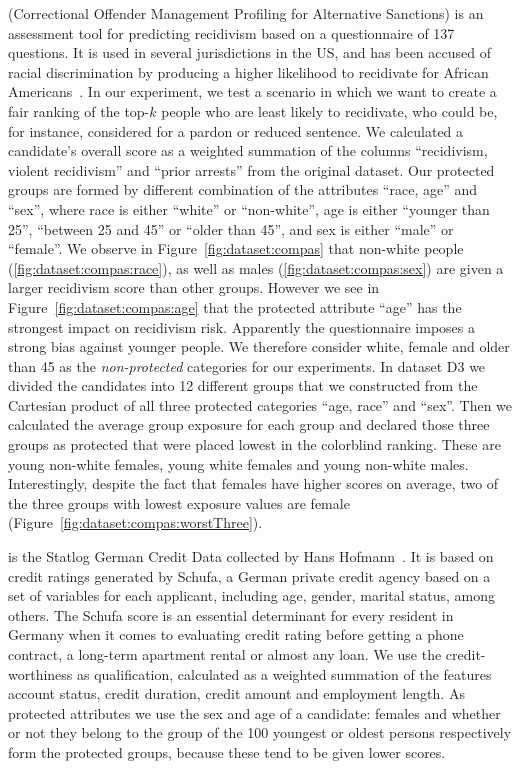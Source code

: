  (Correctional Offender Management Profiling for Alternative Sanctions) is an assessment tool for predicting recidivism based on a questionnaire of 137 questions. It is used in several jurisdictions in the US, and has been accused of racial discrimination by producing a higher likelihood to recidivate for African Americans~\cite{angwin_2016_machine}.
%
In our experiment, we test a scenario in which we want to create a fair ranking of the top-$k$ people who are least likely to recidivate, who could be, for instance, considered for a pardon or reduced sentence.
%
We calculated a candidate's overall score as a weighted summation of the columns ``recidivism, violent recidivism'' and ``prior arrests'' from the original dataset.
%
Our protected groups are formed by different combination of the attributes ``race, age'' and ``sex'', where race is either ``white'' or ``non-white'', age is either ``younger than 25'', ``between 25 and 45'' or ``older than 45'', and sex is either ``male'' or ``female''.
%
We observe in Figure~\ref{fig:dataset:compas} that non-white people (\ref{fig:dataset:compas:race}), as well as males (\ref{fig:dataset:compas:sex}) are given a larger recidivism score than other groups.
%
However we see in Figure~\ref{fig:dataset:compas:age} that the protected attribute ``age'' has the strongest impact on recidivism risk. 
%
Apparently the questionnaire imposes a strong bias against younger people.
%
We therefore consider white, female and older than 45 as the \emph{non-protected} categories for our experiments.
%
In dataset D3 we divided the candidates into 12 different groups that we constructed from the Cartesian product of all three protected categories ``age, race'' and ``sex''. 
%
Then we calculated the average group exposure for each group and declared those three groups as protected that were placed lowest in the colorblind ranking.
%
These are young non-white females, young white females and young non-white males.
%
Interestingly, despite the fact that females have higher scores on average, two of the three groups with lowest exposure values are female (Figure~\ref{fig:dataset:compas:worstThree}).

 is the Statlog German Credit Data collected by Hans Hofmann~\cite{lichman_2013_uci}.
%
It is based on credit ratings generated by Schufa, a German private credit agency based on a set of variables for each applicant, including age, gender, marital status, among others. The Schufa score is an essential determinant for every resident in Germany when it comes to evaluating credit rating before getting a phone contract, a long-term apartment rental or almost any loan.
%
We use the credit-worthiness as qualification, calculated as a weighted summation of the features account status, credit duration, credit amount and employment length. 
As protected attributes we use the sex and age of a candidate: females and whether or not they belong to the group of the 100 youngest or oldest persons respectively form the protected groups, because these tend to be given lower scores.

